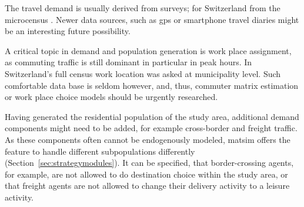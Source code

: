 The travel demand is usually derived from surveys; for Switzerland from the \gls{microcensus} \citep[][]{BfS-MZ2005_manual_2006}. Newer data sources, such as \gls{gps} or smartphone travel diaries might be an interesting future possibility.

A critical topic in demand and population generation is work place assignment, as commuting traffic is still dominant in particular in peak hours. In Switzerland's full census work location was asked at municipality level. Such comfortable data base is seldom however, and, thus, commuter matrix estimation or work place choice models should be urgently researched.

Having generated the residential population of the study area, additional demand components might need to be added, for example cross-border and freight traffic. As these components often cannot be endogenously modeled, \gls{matsim} offers the feature to handle different subpopulations differently (Section~\ref{sec:strategymodules}). It can be specified, that border-crossing agents, for example, are not allowed to do destination choice within the study area, or that freight agents are not allowed to change their delivery activity to a leisure activity.


